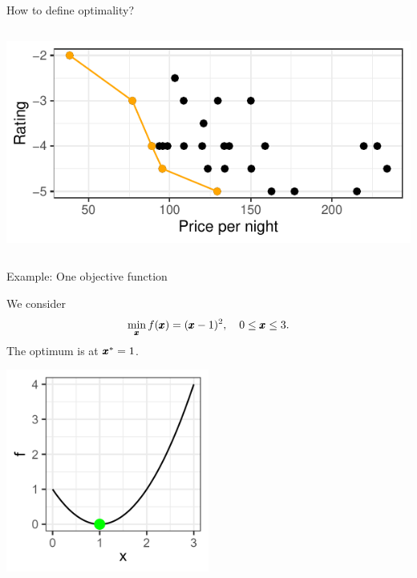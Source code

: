 \documentclass[11pt,compress,t,notes=noshow,xcolor=table]{beamer}
\begin{document}
\begin{vbframe}{How to define optimality?}
\begin{columns}[c]
        \includegraphics[width=\textwidth]{slides/11-multicrit/figure_man/expedia-5-1.pdf}
    \end{columns}

\end{vbframe}

\begin{vbframe}{Example: One objective function}

We consider 
\[
\min_{\pmb{x}} f(\pmb{x}) = (\pmb{x} - 1)^2, 
\quad 0 \le \pmb{x} \le 3.
\]
The optimum is at \({\pmb{x}}^* = 1\).

\begin{center}
\includegraphics[width=0.5\textwidth]{slides/11-multicrit/figure_man/graph1.png}
\end{center}

\end{vbframe}
\end{document}
